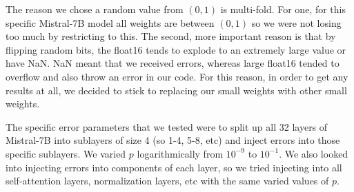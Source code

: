The reason we chose a random value from $(0, 1)$ is multi-fold. For one, for this specific Mistral-7B model all weights are between $(0, 1)$ so we were not losing too much
by restricting to this. The second, more important reason is that by flipping random bits, the float16 tends to explode to an extremely large value or have NaN. NaN meant that we received errors,
whereas large float16 tended to overflow and also throw an error in our code. For this reason, in order to get any results at all, we decided to stick to replacing our small weights with other small weights.

The specific error parameters that we tested were to split up all 32 layers of Mistral-7B into sublayers of size 4 (so 1-4, 5-8, etc) and inject errors into those specific sublayers. We varied $p$ logarithmically from $10^{-9}$ to $10^{-1}$.
We also looked into injecting errors into components of each layer, so we tried injecting into all self-attention layers, normalization layers, etc with the same varied values of $p$.



